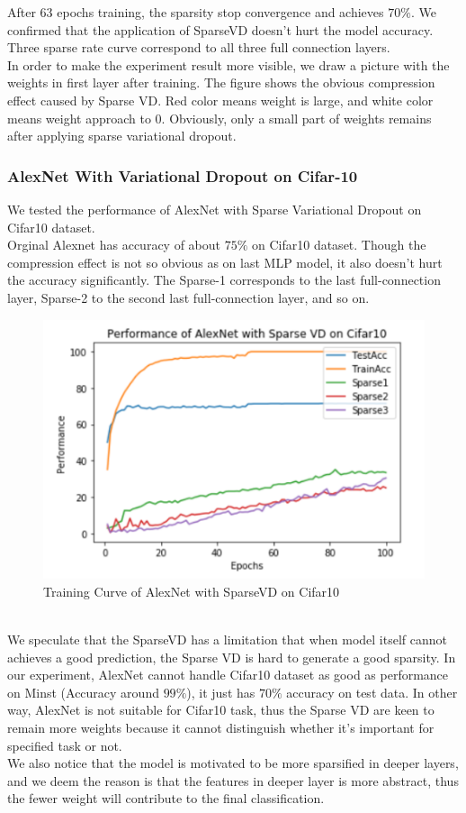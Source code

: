 \documentclass{article}
\begin{document}
	After 63 epochs training, the sparsity stop convergence and achieves $70\%$. We confirmed that the application of SparseVD doesn’t hurt the model accuracy. Three sparse rate curve correspond to all three full connection layers.\\
	In order to make the experiment result more visible, we draw a picture with the weights in first layer after training. The figure shows the obvious compression effect caused by Sparse VD. Red color means weight is large, and white color means weight approach to 0. Obviously, only a small part of weights remains after applying sparse variational dropout.\\

	\subsubsection{AlexNet With Variational Dropout on Cifar-10}
	We tested the performance of AlexNet with Sparse Variational Dropout on Cifar10 dataset.\\
	Orginal Alexnet has accuracy of about $75\%$ on Cifar10 dataset. Though the compression effect is not so obvious as on last MLP model, it also doesn’t hurt the accuracy significantly. The Sparse-1 corresponds to the last full-connection layer, Sparse-2 to the second last full-connection layer, and so on.\\
		\begin{figure}[ht]
			\centering
			\includegraphics[scale=0.4]{pic/exp3.png}
			\caption{Training Curve of AlexNet with SparseVD on Cifar10}
			\label{fig:exp3}
		\end{figure}\\
	We speculate that the SparseVD has a limitation that when model itself cannot achieves a good prediction, the Sparse VD is hard to generate a good sparsity. In our experiment, AlexNet cannot handle Cifar10 dataset as good as performance on Minst (Accuracy around $99\%$), it just has $70\%$ accuracy on test data. In other way, AlexNet is not suitable for Cifar10 task, thus the Sparse VD are keen to remain more weights because it cannot distinguish whether it's important for specified task or not.\\
	We also notice that the model is motivated to be more sparsified in deeper layers, and we deem the reason is that the features in deeper layer is more abstract, thus the fewer weight will contribute to the final classification.\\
\end{document}
